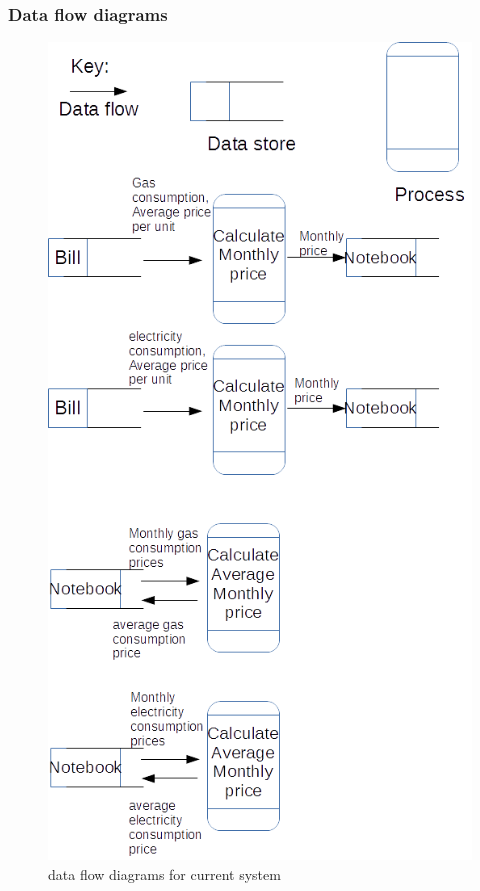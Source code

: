 \subsubsection{Data flow diagrams}
\begin{figure}[H]
    \includegraphics[width=\textwidth]{./dataflowdiagrams1.png}
    \caption{data flow diagrams for current system} \label{fig:dataflowdiagrams}
\end{figure}

